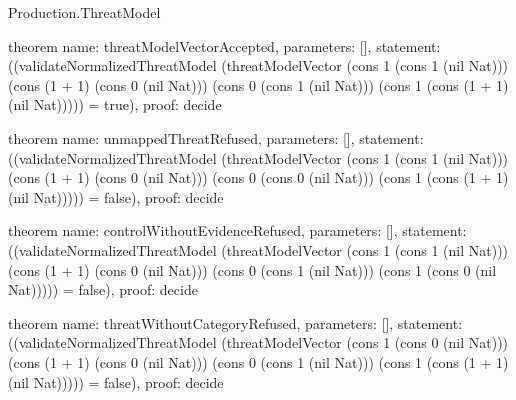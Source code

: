 \begin{lexlean}{Production.ThreatModel}
\begin{semanticmodule}
theorem{
  name: threatModelVectorAccepted,
  parameters: [],
  statement: ((validateNormalizedThreatModel (threatModelVector (cons 1 (cons 1 (nil Nat))) (cons (1 + 1) (cons 0 (nil Nat))) (cons 0 (cons 1 (nil Nat))) (cons 1 (cons (1 + 1) (nil Nat))))) = true),
  proof: decide{}
}

theorem{
  name: unmappedThreatRefused,
  parameters: [],
  statement: ((validateNormalizedThreatModel (threatModelVector (cons 1 (cons 1 (nil Nat))) (cons (1 + 1) (cons 0 (nil Nat))) (cons 0 (cons 0 (nil Nat))) (cons 1 (cons (1 + 1) (nil Nat))))) = false),
  proof: decide{}
}

theorem{
  name: controlWithoutEvidenceRefused,
  parameters: [],
  statement: ((validateNormalizedThreatModel (threatModelVector (cons 1 (cons 1 (nil Nat))) (cons (1 + 1) (cons 0 (nil Nat))) (cons 0 (cons 1 (nil Nat))) (cons 1 (cons 0 (nil Nat))))) = false),
  proof: decide{}
}

theorem{
  name: threatWithoutCategoryRefused,
  parameters: [],
  statement: ((validateNormalizedThreatModel (threatModelVector (cons 1 (cons 0 (nil Nat))) (cons (1 + 1) (cons 0 (nil Nat))) (cons 0 (cons 1 (nil Nat))) (cons 1 (cons (1 + 1) (nil Nat))))) = false),
  proof: decide{}
}
\end{semanticmodule}
\end{lexlean}
